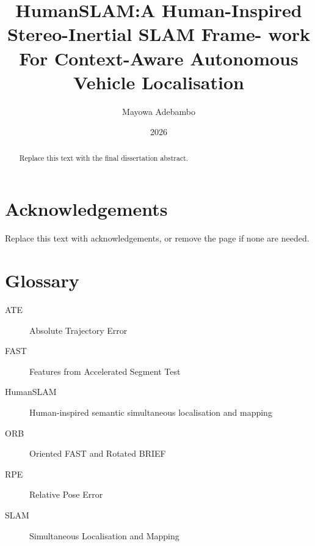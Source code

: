 \documentclass[12pt,a4paper,oneside]{report}
\title{HumanSLAM:A Human-Inspired Stereo-Inertial SLAM Frame-
work For Context-Aware Autonomous Vehicle Localisation}
\author{Mayowa Adebambo}
\date{2026}
\begin{document}
  {}
  {\maketitle}

\begin{abstract}
  Replace this text with the final dissertation abstract.
\end{abstract}

\chapter*{Acknowledgements}
Replace this text with acknowledgements, or remove the page if none are needed.

\chapter*{Glossary}
\begin{description}
  \item[ATE] Absolute Trajectory Error
  \item[FAST] Features from Accelerated Segment Test
  \item[HumanSLAM] Human-inspired semantic simultaneous localisation and mapping
  \item[ORB] Oriented FAST and Rotated BRIEF
  \item[RPE] Relative Pose Error
  \item[SLAM] Simultaneous Localisation and Mapping
\end{description}

\tableofcontents
\listoffigures
\listoftables

\clearpage
{}








\printbibliography[heading=bibintoc]
\appendix

\end{document}
